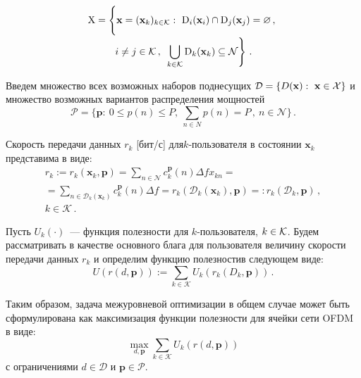 \begin{multicols}{2}
\vspace*{-4pt}

\noindent
  \begin{multline*}
  \mathrm{X}=\left\{ \vphantom{\mathop{\bigcup}\limits_{k\in \mathcal{K}}}
  \mathbf{x} =(\mathbf{x}_k)_{k\in\mathcal{K}}:\ 
\mathrm{D}_i(\mathbf{x}_i) \cap \mathrm{D}_j(\mathbf{x}_j) =\varnothing\,,\right.\\[-3pt]
  \left. i\not=j\in\mathcal{K}\,,\enskip \mathop{\bigcup}\limits_{k\in \mathcal{K}} 
\mathrm{D}_k(\mathbf{x}_k) \subseteq \mathcal{N}\right\}\,.
  \end{multline*}
  
  
     Введем множество всех возможных наборов поднесущих  
$\mathcal{D}\hm=\{D(\mathbf{x}):\ \mathbf{x}\hm\in \mathcal{X}\}$ и множество возможных 
вариантов распределения мощностей 
$$
\mathcal{P}=\{\mathbf{p}:\ 0\leq p(n)\leq P, \ 
\sum\limits_{n\in N} p(n)=P\,, \  n\in \mathcal{N}\}\,.
$$


Скорость передачи данных $r_k$ [бит/с] 
для\linebreak $k$-поль\-зо\-вателя в состоянии $\mathbf{x}_k$ представима в виде:
     \begin{multline*}
     r_k {:=} r_k (\mathbf{x}_k,\mathbf{p}) =\sum\limits_{n\in\mathcal{N}} 
c_k^{\mathbf{p}}(n) \Delta f x_{kn}={}\\
     {}=\sum\limits_{n\in \mathcal{D}_k(\mathbf{x}_k)}  c_k^{\mathbf{p}}(n)\Delta f =r_k 
(\mathcal{D}_k (\mathbf{x}_k),\mathbf{p}) {=:} r_k(\mathcal{D}_k, \mathbf{p})\,,\\ k\in 
\mathcal{K}\,.
     \end{multline*}
     
     Пусть $U_k(\cdot)$~--- функция полезности для $k$-поль\-зо\-ва\-те\-ля, $k\hm\in 
\mathcal{K}$. Будем рассматривать в качестве основного блага для пользователя величину 
скорости передачи данных $r_k$ и определим функцию полезностив следующем виде:
     $$
     U(r(d,\mathbf{p})) {:=} \sum\limits_{k\in \mathcal{K}} 
U_k\left(r_k\left(D_k,\mathbf{p}\right)\right)\,.
     $$
     
     Таким образом, задача межуровневой оптимизации в общем случае может быть 
сформулирована как максимизация функции полезности для ячейки сети OFDM в виде:
     $$
     \max\limits_{d,\mathbf{p}}\sum\limits_{k\in \mathcal{K}} U_k(r(d,\mathbf{p}))
     $$
с ограничениями $d\in \mathcal{D}$ и $\mathbf{p}\in \mathcal{P}$.
     

\end{multicols}
